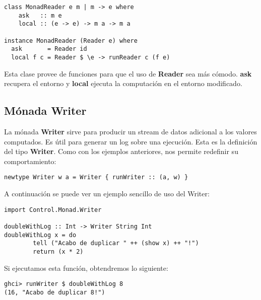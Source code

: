 \begin{lstlisting}
class MonadReader e m | m -> e where
    ask   :: m e
    local :: (e -> e) -> m a -> m a

instance MonadReader (Reader e) where
  ask       = Reader id
  local f c = Reader $ \e -> runReader c (f e)
\end{lstlisting}

Esta clase provee de funciones para que el uso de \textbf{Reader} sea más cómodo. \textbf{ask} recupera el entorno y \textbf{local} ejecuta la computación en el entorno modificado.


\subsection{Mónada Writer} %
\label{sub:m_nada_writer}

La mónada \textbf{Writer} sirve para producir un stream de datos adicional a los valores computados.
Es útil para generar un log sobre una ejecución.
Esta es la definición del tipo \textbf{Writer}. Como con los ejemplos anteriores, nos permite redefinir su comportamiento:

\begin{lstlisting}
newtype Writer w a = Writer { runWriter :: (a, w) }
\end{lstlisting}

A continuación se puede ver un ejemplo sencillo de uso del Writer:

\begin{lstlisting}
import Control.Monad.Writer

doubleWithLog :: Int -> Writer String Int
doubleWithLog x = do
        tell ("Acabo de duplicar " ++ (show x) ++ "!")
        return (x * 2)
\end{lstlisting}

Si ejecutamos esta función, obtendremos lo siguiente:

\begin{lstlisting}
ghci> runWriter $ doubleWithLog 8
(16, "Acabo de duplicar 8!")
\end{lstlisting}



